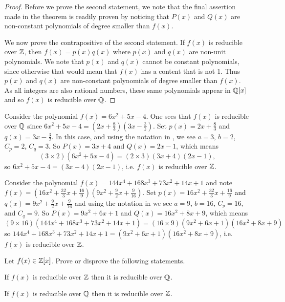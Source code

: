 \begin{proof}
    Before we prove the second statement, we note that the final assertion made in the theorem is readily proven by noticing that $P(x)$ and $Q(x)$ are non-constant polynomials of degree smaller than $f(x)$.

    We now prove the contrapositive of the second statement. If $f(x)$ is reducible over $\mathbb{Z}$, then $f(x) = p(x)q(x)$ where $p(x)$ and $q(x)$ are non-unit polynomials. We note that $p(x)$ and $q(x)$ cannot be constant polynomials, since otherwise that would mean that $f(x)$ has a content that is not 1. Thus $p(x)$ and $q(x)$ are non-constant polynomials of degree smaller than $f(x)$. As all integers are also rational numbers, these same polynomials appear in $\mathbb{Q}[x]$ and so $f(x)$ is reducible over $\mathbb{Q}$.
\end{proof}

\begin{example}
    Consider the polynomial $f(x) = 6x^2 + 5x - 4$. One sees that $f(x)$ is reducible over $\mathbb{Q}$ since $6x^2 + 5x - 4 = \left(2x + \frac83\right)\left(3x - \frac32\right)$. Set $p(x) = 2x + \frac83$ and $q(x) = 3x - \frac32$. In this case, and using the notation in , we see $a = 3$, $b = 2$, $C_p = 2$, $C_q = 3$. So $P(x) = 3x + 4$ and $Q(x) = 2x - 1$, which means
    \[
        (3\times2)(6x^2 + 5x - 4) = (2\times3)(3x+4)(2x-1),
    \]
    so $6x^2 + 5x - 4 = (3x+4)(2x-1)$, i.e. $f(x)$ is reducible over $\mathbb{Z}$.
\end{example}

\begin{example}
    Consider the polynomial $f(x) = 144x^4 + 168x^3 + 73x^2 + 14x + 1$ and note $f(x) = \left(16x^2 + \frac{32}3x + \frac{16}9\right)\left(9x^2 + \frac92x + \frac9{16}\right)$. Set $p(x) = 16x^2 + \frac{32}3x + \frac{16}9$ and $q(x) = 9x^2 + \frac92x + \frac9{16}$ and using the notation in  we see $a = 9$, $b = 16$, $C_p = 16$, and $C_q = 9$. So $P(x) = 9x^2+6x+1$ and $Q(x) = 16x^2 + 8x + 9$, which means
    \[
        (9 \times 16)\left(144x^4 + 168x^3 + 73x^2 + 14x + 1\right) = (16 \times 9)(9x^2+6x+1)(16x^2 + 8x + 9)
    \]
    so $144x^4 + 168x^3 + 73x^2 + 14x + 1 = (9x^2+6x+1)(16x^2 + 8x + 9)$, i.e. $f(x)$ is reducible over $\mathbb{Z}$.
\end{example}

\begin{exercise}
    Let $f(x) \in \mathbb{Z}[x]$. Prove or disprove the following statements.
    \begin{partquestions}{\alph*}
        \item If $f(x)$ is reducible over $\mathbb{Z}$ then it is reducible over $\mathbb{Q}$.
        \item If $f(x)$ is reducible over $\mathbb{Q}$ then it is reducible over $\mathbb{Z}$.
    \end{partquestions}
\end{exercise}

